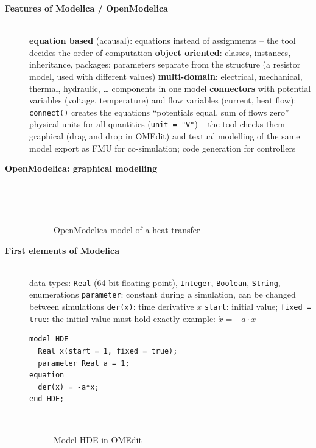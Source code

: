 \begin{description}
\item[{\rot\bf Features of Modelica / OpenModelica}]~\\[-\lblskip]
\bi
	\ite \textbf{equation based} (acausal): equations instead of assignments -- the tool decides the order of computation
	\ite \textbf{object oriented}: classes, instances, inheritance, packages; parameters separate from the structure (a resistor model, used with different values)
	\ite \textbf{multi-domain}: electrical, mechanical, thermal, hydraulic, \ldots{} components in one model
	\ite \textbf{connectors} with potential variables (voltage, temperature) and flow variables (current, heat flow): \texttt{connect()} creates the equations ``potentials equal, sum of flows zero''
	\ite physical units for all quantities (\texttt{unit = "V"}) -- the tool checks them
	\ite graphical (drag and drop in OMEdit) and textual modelling of the same model
	\ite export as FMU for co-simulation; code generation for controllers
\ei
\os{\newpage}

\item[{\rot\bf OpenModelica: graphical modelling}]~\\[-\lblskip]
\begin{figure}[!hbtp]%
     \begin{center}
	  \\
	  \caption{OpenModelica model of a heat transfer}
     \end{center}
\end{figure}
\os{\newpage}

\item[{\rot\bf First elements of Modelica}]~\\[-\lblskip]
\bi
	\ite data types: \texttt{Real} (64 bit floating point), \texttt{Integer}, \texttt{Boolean}, \texttt{String}, enumerations
	\ite \texttt{parameter}: constant during a simulation, can be changed between simulations
	\ite \texttt{der(x)}: time derivative $\dot x$
	\ite \texttt{start}: initial value; \texttt{fixed = true}: the initial value must hold exactly
	\ite example: $\dot x = -a \cdot x$
\ei
\begin{lstlisting}[language={}]
model HDE
  Real x(start = 1, fixed = true);
  parameter Real a = 1;
equation
  der(x) = -a*x;
end HDE;
\end{lstlisting}
\os{\newpage}

\begin{figure}[!hbtp]
     \begin{center}
	  \\
	  \caption{Model HDE in OMEdit}
     \end{center}
\end{figure}
\os{\newpage}


\end{description}
